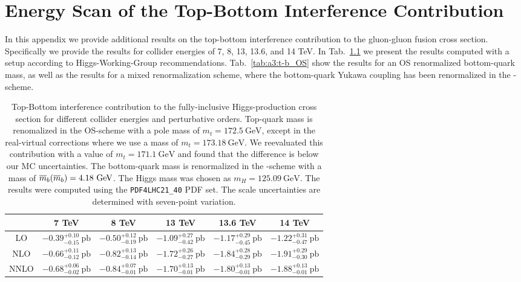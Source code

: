 

\chapter{Energy Scan of the Top-Bottom Interference Contribution}\label{app:3}

In this appendix we provide additional results on the top-bottom interference contribution to the gluon-gluon fusion cross section. Specifically we provide the results for collider energies of 7, 8, 13, 13.6, and 14 TeV. In Tab.~\ref{tab:a3:t-b_MS} we present the results computed with a setup according to Higgs-Working-Group recommendations. Tab.~\ref{tab:a3:t-b_OS} show the results for an \acs{OS} renormalized bottom-quark mass, as well as the results for a mixed renormalization scheme, where the bottom-quark Yukawa coupling has been renormalized in the \MS-scheme.

\begin{table}[h]
\centering
\begin{tabular}{cccccc}
& 7 TeV  & 8 TeV & 13 TeV & 13.6 TeV & 14 TeV  \\
\hline
LO & $-0.39^{+0.10}_{-0.15} \ \text{pb}$ & $-0.50^{+0.12}_{-0.19} \ \text{pb}$ & $-1.09^{+0.27}_{-0.42} \ \text{pb}$ & $-1.17^{+0.29}_{-0.45} \ \text{pb}$ & $-1.22^{+0.31}_{-0.47} \ \text{pb}$  \\
NLO & $-0.66^{+0.11}_{-0.12} \ \text{pb}$ & $-0.82^{+0.13}_{-0.14} \ \text{pb}$ & $-1.72^{+0.26}_{-0.27} \ \text{pb}$ & $-1.84^{+0.28}_{-0.29} \ \text{pb}$ & $-1.91^{+0.29}_{-0.30} \ \text{pb}$ \\
NNLO & $-0.68^{+0.06}_{-0.02} \ \text{pb}$ & $-0.84^{+0.07}_{-0.01} \ \text{pb}$ & $-1.70^{+0.13}_{-0.01} \ \text{pb}$ & $-1.80^{+0.13}_{-0.01} \ \text{pb}$ & $-1.88^{+0.13}_{-0.01} \ \text{pb}$ \\
\end{tabular}
\caption{Top-Bottom interference contribution to the fully-inclusive Higgs-production cross section for different collider energies and perturbative orders. Top-quark mass is renomalized in the \acs{OS}-scheme with a pole mass of $m_t = 172.5\ \mathrm{GeV}$, except in the real-virtual corrections where we use a mass of $m_t = 173.18\ \mathrm{GeV}$. We reevaluated this contribution with a value of $m_t = 171.1\ \mathrm{GeV}$ and found that the difference is below our \acs{MC} uncertainties. The bottom-quark mass is renormalized in the \MS-scheme with a mass of $\overline{m}_{b}\!\left(\overline{m}_{b} \right) = 4.18\ \mathrm{GeV}$. The Higgs mass was chosen as $m_H = 125.09 \ \mathrm{GeV}$. The results were computed using the \texttt{PDF4LHC21\_40} \acs{PDF} set. The scale uncertainties are determined with seven-point variation.}
\label{tab:a3:t-b_MS}
\end{table}

